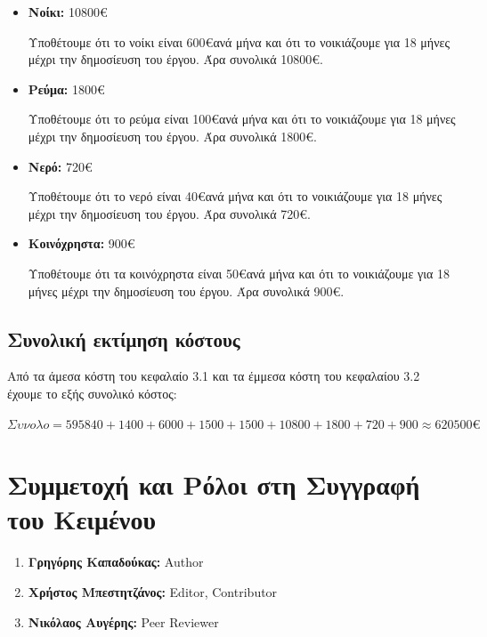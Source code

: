 \documentclass[12pt,a4paper]{article}
\begin{document}
\begin{itemize}
	\item \textbf{Νοίκι:} 10800\euro

		Υποθέτουμε ότι το νοίκι είναι 600\euro\space ανά μήνα και ότι το νοικιάζουμε για 18 μήνες μέχρι την δημοσίευση του έργου. Άρα συνολικά 10800\euro.

	\item \textbf{Ρεύμα:} 1800\euro

		Υποθέτουμε ότι το ρεύμα είναι 100\euro\space ανά μήνα και ότι το νοικιάζουμε για 18 μήνες μέχρι την δημοσίευση του έργου. Άρα συνολικά 1800\euro.

	\item \textbf{Νερό:} 720\euro

		Υποθέτουμε ότι το νερό είναι 40\euro\space ανά μήνα και ότι το νοικιάζουμε για 18 μήνες μέχρι την δημοσίευση του έργου. Άρα συνολικά 720\euro.

	\item \textbf{Κοινόχρηστα:} 900\euro

		Υποθέτουμε ότι τα κοινόχρηστα είναι 50\euro\space ανά μήνα και ότι το νοικιάζουμε για 18 μήνες μέχρι την δημοσίευση του έργου. Άρα συνολικά 900\euro.
\end{itemize}

\subsection{Συνολική εκτίμηση κόστους}

Από τα άμεσα κόστη του κεφαλαίο 3.1 και τα έμμεσα κόστη του κεφαλαίου 3.2 έχουμε το εξής συνολικό κόστος:

$Συνολο = 595840 + 1400 + 6000 + 1500 + 1500 + 10800 + 1800 + 720 + 900 \approx 620500\euro$

\section{Συμμετοχή και Ρόλοι στη Συγγραφή του Κειμένου}
\begin{enumerate}
	\item \textbf{Γρηγόρης Καπαδούκας:} Author
	\item \textbf{Χρήστος Μπεστητζάνος:} Editor, Contributor
	\item \textbf{Νικόλαος Αυγέρης:} Peer Reviewer
\end{enumerate}
\end{document}
